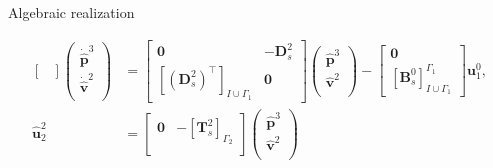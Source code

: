 \documentclass[aspectratio=169]{beamer}
\newcommand*{\dual}[1]{\ensuremath{\widehat{#1}}}
\begin{document}
\begin{frame}{Algebraic realization}
{\begin{tcolorbox}
\begin{equation*}
\begin{aligned}
\begin{bmatrix}
						\end{bmatrix}
						\begin{pmatrix}
							\dot{\dual{\mathbf{p}}}^3 \\
							\dot{\dual{\mathbf{v}}}^2 \\
						\end{pmatrix} &=  
						\begin{bmatrix}
							\mathbf{0} & -\mathbf{D}^{2}_s \\
							[(\mathbf{D}_{s}^{2})^\top]_{I \cup \Gamma_1} & \mathbf{0}
						\end{bmatrix}
						\begin{pmatrix}
							\dual{\mathbf{p}}^3 \\
							\dual{\mathbf{v}}^2 \\
						\end{pmatrix} -
						\begin{bmatrix}
							\mathbf{0}\\
							[\mathbf{B}^{0}_{s}]_{I \cup \Gamma_1}^{\Gamma_1}
						\end{bmatrix}
						\mathbf{u}^{0}_1, \\
						\dual{\mathbf{u}}^{2}_2 &= 
						\begin{bmatrix}
							\mathbf{0} & -[\mathbf{T}^{2}_{s}]_{\Gamma_2} \\
						\end{bmatrix}
						\begin{pmatrix}
							\dual{\mathbf{p}}^3 \\
							\dual{\mathbf{v}}^2 \\
						\end{pmatrix}
					\end{aligned}
				\end{equation*}
			\end{tcolorbox} 
		}
		
		
	\end{frame}
	
	
	
\end{document}
